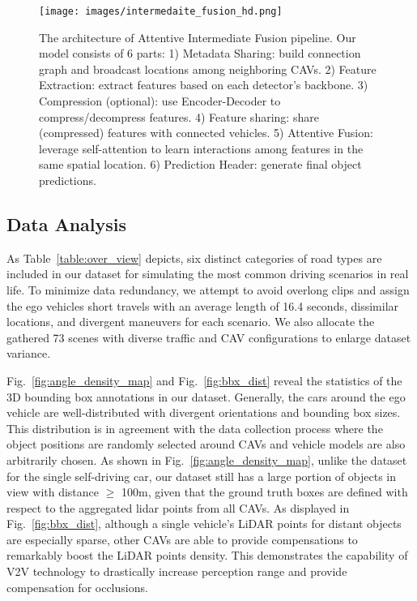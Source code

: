 \begin{figure*}[!t]
\centering
\texttt{[image: images/intermedaite\_fusion\_hd.png]}
\caption{The architecture of Attentive Intermediate Fusion pipeline. Our model consists of 6 parts: 1) Metadata Sharing: build connection graph and broadcast locations among neighboring CAVs. 2) Feature Extraction: extract features based on each detector's backbone. 3) Compression (optional): use Encoder-Decoder to compress/decompress features. 4) Feature sharing: share (compressed) features with connected vehicles. 5) Attentive Fusion: leverage self-attention to learn interactions among features in the same spatial location. 6) Prediction Header: generate final object predictions.}
\label{fig:intermediate}
\end{figure*} 

\subsection{Data Analysis}
As Table~\ref{table:over_view} depicts, six distinct categories of road types are included in our dataset for simulating the most common driving scenarios in real life. To minimize data redundancy, we attempt to avoid overlong clips and assign the ego vehicles short travels with an average length of 16.4 seconds,  dissimilar locations,  and divergent maneuvers for each scenario. We also allocate the gathered 73 scenes with diverse traffic and CAV configurations to enlarge dataset variance.  

Fig.~\ref{fig:angle_density_map} and Fig.~\ref{fig:bbx_dist} reveal the statistics of the 3D bounding box annotations in our dataset.  Generally, the cars around the ego vehicle are well-distributed with divergent orientations and bounding box sizes. This distribution is in agreement with the data collection process where the object positions are randomly selected around CAVs and vehicle models are also arbitrarily chosen. As shown in Fig.~\ref{fig:angle_density_map}, unlike the dataset for the single self-driving car, our dataset still has a large portion of objects in view with distance $\geq$ 100m, given that the ground truth boxes are defined with respect to the aggregated lidar points from all CAVs. As displayed in Fig.~\ref{fig:bbx_dist}, although a single vehicle's LiDAR points for distant objects are especially sparse, other CAVs are able to provide compensations to remarkably boost the LiDAR points density. This demonstrates the capability of V2V technology to drastically increase perception range and provide compensation for occlusions.

